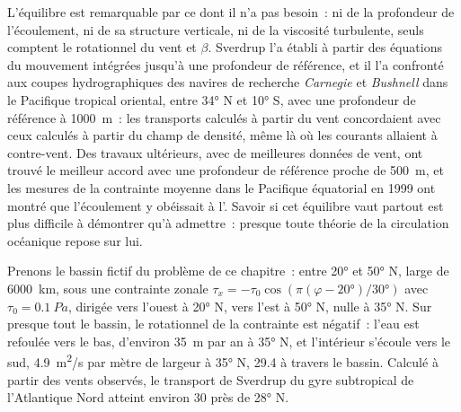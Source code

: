 L'équilibre est remarquable par ce dont il n'a pas besoin~: ni de la profondeur de
l'écoulement, ni de sa structure verticale, ni de la viscosité turbulente, seuls comptent
le rotationnel du vent et $\beta$. Sverdrup l'a établi à partir des équations du
mouvement intégrées jusqu'à une profondeur de référence, et il l'a confronté aux
coupes hydrographiques des navires de recherche \emph{Carnegie} et
\emph{Bushnell} dans le Pacifique tropical oriental, entre \ang{34} N et
\ang{10} S, avec une profondeur de référence à \qty{1000}{m}~: les transports
calculés à partir du vent concordaient avec ceux calculés à partir du champ de densité, même
là où les courants allaient à contre-vent. Des travaux ultérieurs, avec de meilleures données de vent,
ont trouvé le meilleur accord avec une profondeur de référence proche de \qty{500}{m}, et
les mesures de la contrainte moyenne dans le Pacifique équatorial en 1999 ont montré que
l'écoulement y obéissait à l'. Savoir si cet équilibre vaut partout
est plus difficile à démontrer qu'à admettre~: presque toute théorie de la
circulation océanique repose sur lui.

Prenons le bassin fictif du problème de ce chapitre~: entre \ang{20} et
\ang{50} N, large de \qty{6000}{km}, sous une contrainte zonale $\tau_x =
-\tau_0\cos(\pi(\varphi - \ang{20})/\ang{30})$ avec $\tau_0 =
\qty{0.1}{Pa}$, dirigée vers l'ouest à \ang{20} N, vers l'est à \ang{50} N, nulle à
\ang{35} N. Sur presque tout le bassin, le rotationnel de la contrainte est négatif~:
l'eau est refoulée vers le bas, d'environ \qty{35}{m} par an à \ang{35} N, et
l'intérieur s'écoule vers le sud, \qty{4.9}{m^2/s} par mètre de largeur à \ang{35} N,
\qty{29.4}{\sverdrup} à travers le bassin. Calculé à partir des vents observés,
le transport de Sverdrup du gyre subtropical de l'Atlantique Nord atteint environ
\qty{30}{\sverdrup} près de \ang{28} N.

